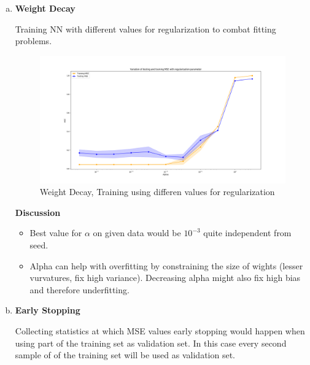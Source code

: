 \documentclass[12pt,a4paper]{article}
\begin{document}
\begin{enumerate}[a)]
  
  
  \item \textbf{Weight Decay}
  
Training NN with different values for regularization to combat fitting problems.
  
\begin{figure}[H]
	\centering
  \includegraphics[width=\textwidth]{figures/1_2_a.png}
	\caption{Weight Decay, Training using differen values for regularization}
	\label{1_2_a}
\end{figure}

\textbf{Discussion}

\begin{itemize}
  \item Best value for $\alpha$ on given data would be $10^{-3}$ quite
  independent from seed.
  \item Alpha can help with overfitting by
  constraining the size of wights (lesser
  vurvatures, fix high variance)\autocite{scikit:regularization}. Decreasing
  alpha might also fix high bias and therefore underfitting.
\end{itemize}

  
  \item \textbf{Early Stopping}

Collecting statistics at which MSE values early stopping would happen when using
part of the training set as validation set. In this case every second sample of
of the training set will be used as validation set.


\end{enumerate}
\end{document}
